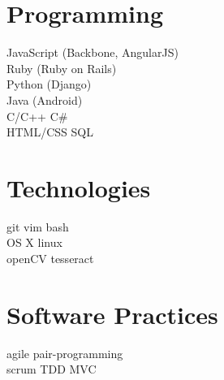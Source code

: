 \documentclass[]{deedy-resume}
\begin{document}
%
%

%
%

%
%

\begin{minipage}[t]{0.33\textwidth}


\section{Programming}
JavaScript (Backbone, AngularJS) \\
Ruby (Ruby on Rails) \\
Python (Django) \\
Java (Android) \\
C/C++ \textbullet{} C\# \\
HTML/CSS \textbullet{} SQL \\

\section{Technologies}
git \textbullet{} vim \textbullet{} bash \\
OS X \textbullet{} linux \\
openCV \textbullet{} tesseract \\
\sectionsep

\section{Software Practices}
agile \textbullet{} pair-programming \\
scrum \textbullet{} TDD \textbullet{} MVC \\


\end{minipage}
\end{document}
